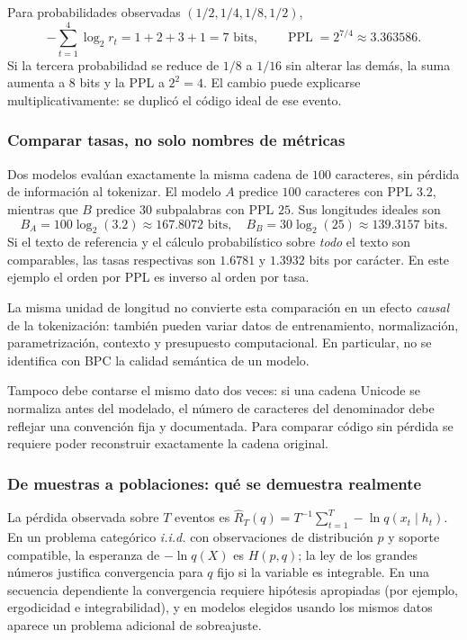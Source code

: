 \begin{ejemplo}
Para probabilidades observadas $(1/2,1/4,1/8,1/2)$,
\[
-\sum_{t=1}^4\log_2r_t=1+2+3+1=7\text{ bits},
\qquad\operatorname{PPL}=2^{7/4}\approx3.363586.
\]
Si la tercera probabilidad se reduce de $1/8$ a $1/16$ sin alterar las demás,
la suma aumenta a $8$ bits y la PPL a $2^2=4$. El cambio puede
explicarse multiplicativamente: se duplicó el código ideal de ese evento.
\end{ejemplo}

\subsubsection*{Comparar tasas, no solo nombres de métricas}

Dos modelos evalúan exactamente la misma cadena de $100$ caracteres,
sin pérdida de información al tokenizar. El modelo $A$ predice
$100$ caracteres con PPL $3.2$, mientras que $B$ predice $30$ subpalabras
con PPL $25$. Sus longitudes ideales son
\[
B_A=100\log_2(3.2)\approx167.8072\text{ bits},\quad
B_B=30\log_2(25)\approx139.3157\text{ bits}.
\]
Si el texto de referencia y el cálculo probabilístico sobre \emph{todo} el texto
son comparables, las tasas respectivas son $1.6781$ y $1.3932$ bits por
carácter. En este ejemplo el orden por PPL es inverso al orden por tasa.

\begin{nota}
La misma unidad de longitud no convierte esta comparación en un efecto
\emph{causal} de la tokenización: también pueden variar datos de entrenamiento,
normalización, parametrización, contexto y presupuesto computacional. En particular,
no se identifica con BPC la calidad semántica de un modelo.
\end{nota}
Tampoco debe contarse el mismo dato dos veces: si una cadena Unicode se
normaliza antes del modelado, el número de caracteres del denominador debe
reflejar una convención fija y documentada. Para comparar código sin pérdida
se requiere poder reconstruir exactamente la cadena original.

\subsubsection*{De muestras a poblaciones: qué se demuestra realmente}

La pérdida observada sobre $T$ eventos es
$\widehat R_T(q)=T^{-1}\sum_{t=1}^T-\ln q(x_t\mid h_t)$.
En un problema categórico \emph{i.i.d.} con observaciones de distribución
$p$ y soporte compatible, la esperanza de $-\ln q(X)$ es $H(p,q)$;
la ley de los grandes números justifica convergencia para $q$ fijo
si la variable es integrable. En una secuencia dependiente la convergencia
requiere hipótesis apropiadas (por ejemplo, ergodicidad e integrabilidad),
y en modelos elegidos usando los mismos datos aparece un problema adicional
de sobreajuste.

